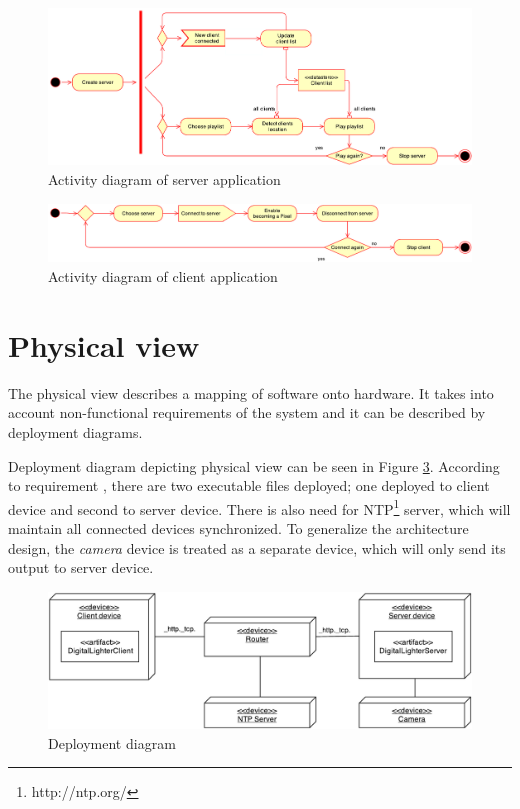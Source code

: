 \begin{figure}[h]
	\centering
		\includegraphics[width=16.2cm]{softwareArchitecture/activity_server.pdf}
	\caption{Activity diagram of server application}
	\label{fig:activity_diagram_server}
\end{figure}

\begin{figure}[h]
	\centering
		\includegraphics[width=16.2cm]{softwareArchitecture/activity_client.pdf}
	\caption{Activity diagram of client application}
	\label{fig:activity_diagram_client}
\end{figure}


\section{Physical view}
The physical view \cite{Kruchten:1995:VMA:624610.625529} describes a mapping of software onto hardware. 
It takes into account non-functional requirements of the system and it can be described by deployment diagrams.

Deployment diagram depicting physical view can be seen in Figure \ref{fig:architecture_deployment_diagram}.
According to requirement , there are two executable files deployed; one deployed to client device and second to server device.
There is also need for NTP\footnote{http://ntp.org/} server, which will maintain all connected devices synchronized.
To generalize the architecture design, the \emph{camera} device is treated as a separate device, which will only send its output to server device.

\begin{figure}[h]
	\centering
		\includegraphics[width=15cm]{softwareArchitecture/deployment-diagram.pdf}
	\caption{Deployment diagram}
	\label{fig:architecture_deployment_diagram}
\end{figure}


